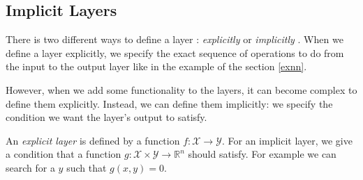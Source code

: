 \documentclass[10pt,a4paper]{article}
\theoremstyle{definition}
\theoremstyle{definition}
\newtheorem{theorem}{Theorem}
\theoremstyle{definition}
\begin{document}
\subsection{Implicit Layers}

There is two different ways to define a layer : \textit{explicitly} or \textit{implicitly} \cite{2}. When we define a layer explicitly, we specify the exact sequence of operations to do from the input to the output layer like in the example of the section \ref{exnn}. 

However, when we add some functionality to the layers, it can become complex to define them explicitly. Instead, we can define them implicitly: we specify the condition we want the layer's output to satisfy. 

An \textit{explicit layer} is defined by a function $f : \mathcal{X} \rightarrow \mathcal{Y}$. For an implicit layer, we give a condition that a function $g: \mathcal{X} \times \mathcal{Y} \rightarrow \mathbb{R}^n$ should satisfy. For example we can search for a $y$ such that $g(x,y) = 0$.

%
%
%
%
%
\end{document}

